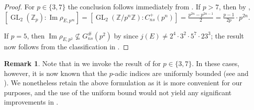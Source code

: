 \documentclass{amsart}
\newcommand{\op}[1]{\operatorname{#1}}
\theoremstyle{definition}
\newtheorem{remark}[theorem]{Remark}
\newcommand{\Z}{\mathbb{Z}}
\newcommand{\GL}{\operatorname{GL}}
\numberwithin{theorem}{section}
\numberwithin{equation}{section}
\begin{document}
\begin{proof}
    For $p \in \{3,7\}$ the conclusion follows immediately from \cite[Proposition 6.7]{furio24}. If $p>7$, then by , $[\GL_2(\Z_p) : \operatorname{Im}\rho_{E,p^\infty}] = [\op{GL}_2(\Z/p^n\Z):C_{ns}^+(p^n)] = \frac{p^{2n}-p^{2n-1}}{2} =\frac{p-1}{2p} \cdot p^{2n}$.

    If $p=5$, then $\operatorname{Im}\rho_{E,p^2} \not\subseteq G_{ns}^\#(p^2)$ by \cite[Theorem 1.6]{rszb22} since $j(E) \ne 2^{4} \cdot 3^{2} \cdot 5^{7} \cdot 23^{3}$; the result now follows from the classification in \cite[Theorem 6.5]{furio24}.
\end{proof}

\begin{remark}
    Note that in  we invoke the result of \cite[Proposition 6.7]{furio24} for $p \in \{3,7\}$. In these cases, however, it is now known that the $p$-adic indices are uniformly bounded (see \cite[Theorem 1.4]{balakrishnan25} and \cite[Corollary 1.5]{furio20257adicgaloisrepresentationselliptic}). We nonetheless retain the above formulation as it is more convenient for our purposes, and the use of the uniform bound would not yield any significant improvements in .
\end{remark}
\end{document}
